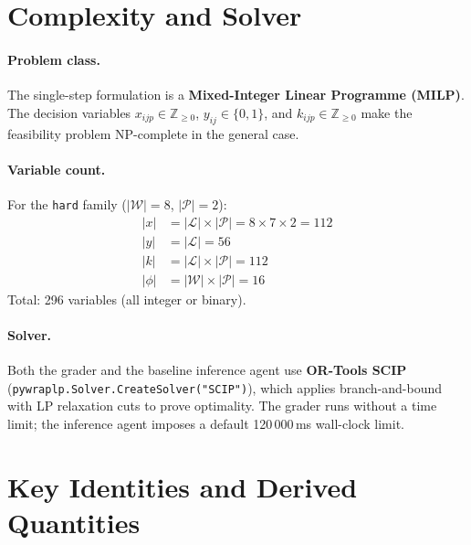 \documentclass[11pt, a4paper]{article}
\begin{document}
\section{Complexity and Solver}

\paragraph{Problem class.}
The single-step formulation is a \textbf{Mixed-Integer Linear Programme
(MILP)}.  The decision variables $x_{ijp} \in \mathbb{Z}_{\geq 0}$,
$y_{ij} \in \{0,1\}$, and $k_{ijp} \in \mathbb{Z}_{\geq 0}$ make the
feasibility problem NP-complete in the general case.

\paragraph{Variable count.}
For the \texttt{hard} family ($|\mathcal{W}|=8$, $|\mathcal{P}|=2$):
\begin{align*}
  |x| &= |\mathcal{L}| \times |\mathcal{P}|
       = 8 \times 7 \times 2 = 112 \\
  |y| &= |\mathcal{L}| = 56 \\
  |k| &= |\mathcal{L}| \times |\mathcal{P}| = 112 \\
  |\phi| &= |\mathcal{W}| \times |\mathcal{P}| = 16
\end{align*}
Total: 296 variables (all integer or binary).

\paragraph{Solver.}
Both the grader and the baseline inference agent use
\textbf{OR-Tools SCIP} (\texttt{pywraplp.Solver.CreateSolver("SCIP")}),
which applies branch-and-bound with LP relaxation cuts to prove
optimality.  The grader runs without a time limit; the inference agent
imposes a default 120\,000\,ms wall-clock limit.

\section{Key Identities and Derived Quantities}
\end{document}
